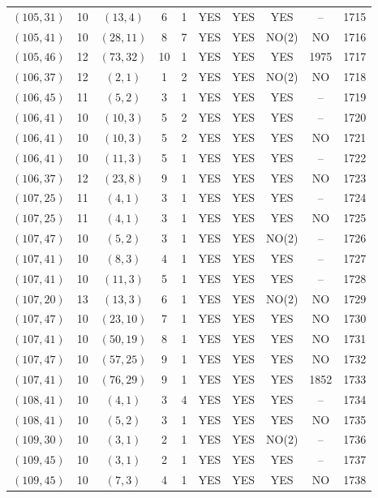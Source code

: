 \begin{longtable}{|c|c|c|c|c|c|c|c|c|c|}
$(105, 31)$ & 10 & $(13, 4)$ & 6 & 1 & YES & YES & YES & -- & 1715\\
$(105, 41)$ & 10 & $(28, 11)$ & 8 & 7 & YES & YES & NO(2) & NO & 1716\\
$(105, 46)$ & 12 & $(73, 32)$ & 10 & 1 & YES & YES & YES & 1975 & 1717\\
$(106, 37)$ & 12 & $(2, 1)$ & 1 & 2 & YES & YES & NO(2) & NO & 1718\\
$(106, 45)$ & 11 & $(5, 2)$ & 3 & 1 & YES & YES & YES & -- & 1719\\
$(106, 41)$ & 10 & $(10, 3)$ & 5 & 2 & YES & YES & YES & -- & 1720\\
$(106, 41)$ & 10 & $(10, 3)$ & 5 & 2 & YES & YES & YES & NO & 1721\\
$(106, 41)$ & 10 & $(11, 3)$ & 5 & 1 & YES & YES & YES & -- & 1722\\
$(106, 37)$ & 12 & $(23, 8)$ & 9 & 1 & YES & YES & YES & NO & 1723\\
$(107, 25)$ & 11 & $(4, 1)$ & 3 & 1 & YES & YES & YES & -- & 1724\\
$(107, 25)$ & 11 & $(4, 1)$ & 3 & 1 & YES & YES & YES & NO & 1725\\
$(107, 47)$ & 10 & $(5, 2)$ & 3 & 1 & YES & YES & NO(2) & -- & 1726\\
$(107, 41)$ & 10 & $(8, 3)$ & 4 & 1 & YES & YES & YES & -- & 1727\\
$(107, 41)$ & 10 & $(11, 3)$ & 5 & 1 & YES & YES & YES & -- & 1728\\
$(107, 20)$ & 13 & $(13, 3)$ & 6 & 1 & YES & YES & NO(2) & NO & 1729\\
$(107, 47)$ & 10 & $(23, 10)$ & 7 & 1 & YES & YES & YES & NO & 1730\\
$(107, 41)$ & 10 & $(50, 19)$ & 8 & 1 & YES & YES & YES & NO & 1731\\
$(107, 47)$ & 10 & $(57, 25)$ & 9 & 1 & YES & YES & YES & NO & 1732\\
$(107, 41)$ & 10 & $(76, 29)$ & 9 & 1 & YES & YES & YES & 1852 & 1733\\
$(108, 41)$ & 10 & $(4, 1)$ & 3 & 4 & YES & YES & YES & -- & 1734\\
$(108, 41)$ & 10 & $(5, 2)$ & 3 & 1 & YES & YES & YES & NO & 1735\\
$(109, 30)$ & 10 & $(3, 1)$ & 2 & 1 & YES & YES & NO(2) & -- & 1736\\
$(109, 45)$ & 10 & $(3, 1)$ & 2 & 1 & YES & YES & YES & -- & 1737\\
$(109, 45)$ & 10 & $(7, 3)$ & 4 & 1 & YES & YES & YES & NO & 1738\\

\end{longtable}
